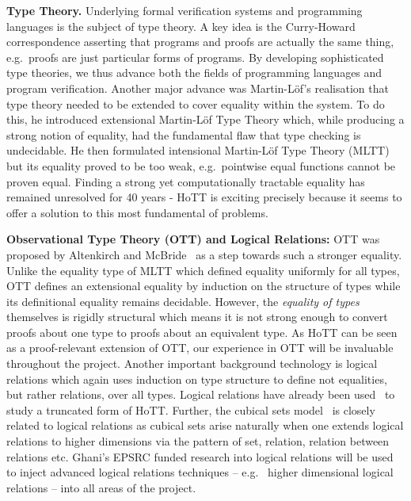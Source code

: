 \documentclass[a4paper,11pt]{article}
\newcommand{\eg}{{e.g.}\ }
\begin{document}
{\bf Type Theory.} Underlying formal verification systems and
programming languages is the subject of type theory. A key idea is the
Curry-Howard correspondence asserting that programs and proofs
are actually the same thing, \eg proofs are just particular forms of
programs. By developing sophisticated type theories, we
thus advance both the fields of programming languages and program
verification. Another major advance was Martin-L\"of's realisation
that type theory needed to be extended to cover equality within the
system. %
To do this, he introduced extensional Martin-L\"of Type Theory which, while
producing a strong notion of equality, had the fundamental flaw
that type checking is undecidable. He then 
formulated intensional Martin-L\"of Type Theory (MLTT) but its
equality proved to be too weak, \eg pointwise equal functions 
cannot be proven equal. Finding a strong yet computationally tractable equality has remained
unresolved for 40 years - HoTT is exciting precisely because
it seems to offer a solution to this most fundamental of problems. 


{\bf Observational Type Theory (OTT) and Logical Relations:} OTT was
proposed by Altenkirch and McBride~\cite{alti:ott-conf} as a step
towards such a stronger equality. Unlike the equality type of MLTT which
defined equality uniformly for all types, OTT defines an extensional equality by
induction on the structure of types while
its definitional equality remains decidable. However, the {\em
  equality of types} themselves is rigidly structural which means it
is not strong enough to convert proofs about one type to proofs about
an equivalent type. As HoTT can be seen as a proof-relevant
extension of OTT, our experience in OTT will be invaluable throughout
the project. Another important background technology is logical
relations which again uses induction on type structure to define not
equalities, but rather relations, over all types. Logical relations
have already been used~\cite{licataHarper:canonicity2d} to study a
truncated form of HoTT. Further, the cubical sets
model~\cite{BezemM:cubsmt} is closely related to logical relations as
cubical sets arise naturally when one extends logical relations to
higher dimensions via the pattern of set, relation, relation between
relations etc. Ghani's EPSRC funded research into logical relations
will be used to inject advanced logical relations techniques -- \eg
higher dimensional logical relations -- into all areas of the project.
\end{document}
